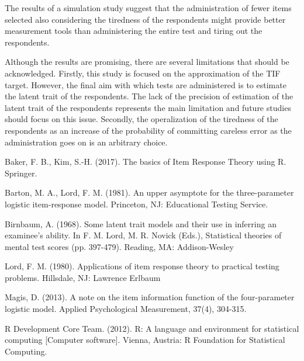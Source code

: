 \documentclass{svproc}
\begin{document}
The results of a simulation study suggest that the administration of fewer items selected also considering the tiredness of the respondents might provide better measurement tools  than administering the entire test and tiring out the respondents. 

Although the results are promising, there are several limitations that should be acknowledged. Firstly, this study is focused on the approximation of the TIF target. However, the final aim with which tests are administered is to estimate the latent trait of the respondents. The lack of the precision of estimation of the latent trait of the respondents represents the main limitation and future studies should focus on this issue. 
Secondly, the operalization of the tiredness of the respondents as an increase of the probability of committing careless error as the administration goes on is an arbitrary choice.




%
\begin{thebibliography}{6}
%

 Baker, F. B., Kim, S.-H. (2017). The basics of Item Response Theory using R. Springer.

Barton, M. A., Lord, F. M. (1981). An upper asymptote for the three-parameter logistic item-response
model. Princeton, NJ: Educational Testing Service.

Birnbaum, A. (1968). Some latent trait models and their use in inferring an examinee’s ability. In F. M.
Lord, M. R. Novick (Eds.), Statistical theories of mental test scores (pp. 397-479). Reading, MA:
Addison-Wesley

Lord, F. M. (1980). Applications of item response theory to practical testing problems. Hillsdale, NJ:
Lawrence Erlbaum

Magis, D. (2013). A note on the item information function of the four-parameter logistic model. Applied Psychological Measurement, 37(4), 304-315.


R Development Core Team. (2012). R: A language and environment for statistical computing [Computer
software]. Vienna, Austria: R Foundation for Statistical Computing.




\end{thebibliography}
\end{document}
